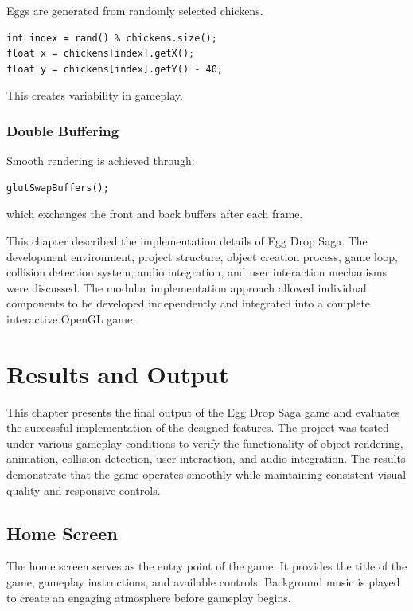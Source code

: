 \documentclass[12pt,a4paper]{report}
\begin{document}
Eggs are generated from randomly selected chickens.

\begin{verbatim}
int index = rand() % chickens.size();
float x = chickens[index].getX();
float y = chickens[index].getY() - 40;
\end{verbatim}

This creates variability in gameplay.

\subsection*{Double Buffering}

Smooth rendering is achieved through:

\begin{verbatim}
glutSwapBuffers();
\end{verbatim}

which exchanges the front and back buffers after each frame.



This chapter described the implementation details of Egg Drop Saga. The development environment, project structure, object creation process, game loop, collision detection system, audio integration, and user interaction mechanisms were discussed. The modular implementation approach allowed individual components to be developed independently and integrated into a complete interactive OpenGL game.



\chapter{Results and Output}


This chapter presents the final output of the Egg Drop Saga game and evaluates the successful implementation of the designed features. The project was tested under various gameplay conditions to verify the functionality of object rendering, animation, collision detection, user interaction, and audio integration. The results demonstrate that the game operates smoothly while maintaining consistent visual quality and responsive controls.

\section{Home Screen}

The home screen serves as the entry point of the game. It provides the title of the game, gameplay instructions, and available controls. Background music is played to create an engaging atmosphere before gameplay begins.
\end{document}
